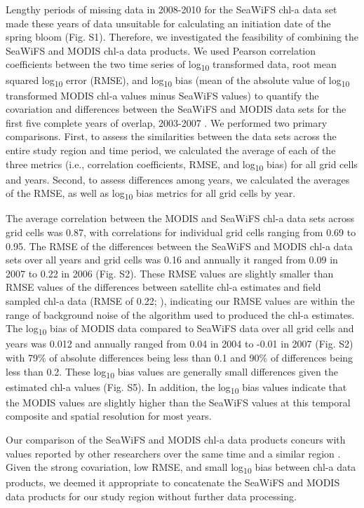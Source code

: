 Lengthy periods of missing data in 2008-2010 for the SeaWiFS chl-a data set made
these years of data unsuitable for calculating an initiation date of the spring
bloom (Fig. S1). Therefore, we investigated the feasibility of combining the
SeaWiFS and MODIS chl-a data products. We used Pearson correlation coefficients
between the two time series of log\textsubscript{10} transformed data, root mean
squared log\textsubscript{10} error (RMSE), and log\textsubscript{10} bias (mean
of the absolute value of log\textsubscript{10} transformed MODIS chl-a values
minus SeaWiFS values) to quantify the covariation and differences between the
SeaWiFS and MODIS data sets for the first five complete years of overlap,
2003-2007 \citep{Gregg2004, OReilly2000a, Zhang2006} . We performed two primary
comparisons. First, to assess the similarities between the data sets across the
entire study region and time period, we calculated the average of each of the
three metrics (i.e., correlation coefficients, RMSE, and log\textsubscript{10}
bias) for all grid cells and years. Second, to assess differences among years,
we calculated the averages of the RMSE, as well as log\textsubscript{10} bias
metrics for all grid cells by year.

The average correlation between the MODIS and SeaWiFS chl-a data sets
across grid cells was 0.87, with correlations for individual grid cells
ranging from 0.69 to 0.95. The RMSE of the differences between the
SeaWiFS and MODIS chl-a data sets over all years and grid cells was 0.16
and annually it ranged from 0.09 in 2007 to 0.22 in 2006 (Fig. S2).
These RMSE values are slightly smaller than RMSE values of the
differences between satellite chl-a estimates and field sampled chl-a
data (RMSE of 0.22; \citep{OReilly2000a}), indicating our RMSE values
are within the range of background noise of the algorithm used to
produced the chl-a estimates. The log\textsubscript{10} bias of MODIS
data compared to SeaWiFS data over all grid cells and years was 0.012
and annually ranged from 0.04 in 2004 to -0.01 in 2007 (Fig. S2) with
79\% of absolute differences being less than 0.1 and 90\% of differences
being less than 0.2. These log\textsubscript{10} bias values are
generally small differences given the estimated chl-a values (Fig. S5).
In addition, the log\textsubscript{10} bias values indicate that the
MODIS values are slightly higher than the SeaWiFS values at this
temporal composite and spatial resolution for most years.

Our comparison of the SeaWiFS and MODIS chl-a data products concurs with
values reported by other researchers over the same time and a similar
region \citep{Waite2013}. Given the strong covariation, low RMSE,
and small log\textsubscript{10} bias between chl-a data products, we
deemed it appropriate to concatenate the SeaWiFS and MODIS data products
for our study region without further data processing.

